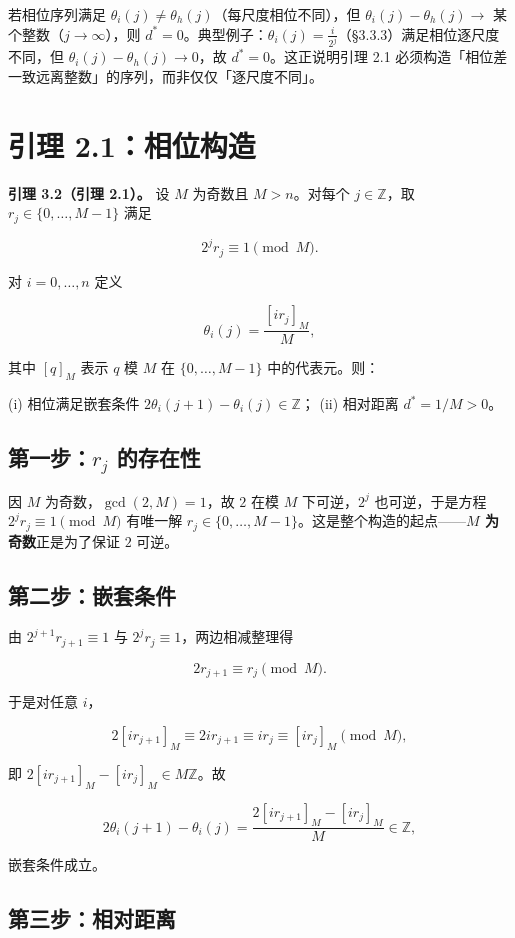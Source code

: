 \documentclass[a4paper,11pt,openany]{ctexbook}
\numberwithin{equation}{chapter}
\numberwithin{figure}{chapter}
\numberwithin{table}{chapter}
\begin{document}
若相位序列满足 $\theta_i(j)\neq\theta_h(j)$（每尺度相位不同），但 $\theta_i(j)-\theta_h(j)\to$ 某个整数（$j\to\infty$），则 $d^*=0$。典型例子：$\theta_i(j)=\frac{i}{2^j}$（§3.3.3）满足相位逐尺度不同，但 $\theta_i(j)-\theta_h(j)\to0$，故 $d^*=0$。这正说明引理 2.1 必须构造「相位差一致远离整数」的序列，而非仅仅「逐尺度不同」。

\section{引理 2.1：相位构造}

\textbf{引理 3.2（引理 2.1）。} 设 $M$ 为奇数且 $M>n$。对每个 $j\in\mathbb Z$，取 $r_j\in\{0,\dots,M-1\}$ 满足

$$2^j r_j\equiv1\pmod M .$$

对 $i=0,\dots,n$ 定义

$$\theta_i(j)=\frac{[ir_j]_M}{M},$$

其中 $[q]_M$ 表示 $q$ 模 $M$ 在 $\{0,\dots,M-1\}$ 中的代表元。则：

(i) 相位满足嵌套条件 $2\theta_i(j+1)-\theta_i(j)\in\mathbb Z$；
(ii) 相对距离 $d^*=1/M>0$。

\subsection{第一步：$r_j$ 的存在性}

因 $M$ 为奇数，$\gcd(2,M)=1$，故 $2$ 在模 $M$ 下可逆，$2^j$ 也可逆，于是方程 $2^j r_j\equiv1\pmod M$ 有唯一解 $r_j\in\{0,\dots,M-1\}$。这是整个构造的起点——\textbf{$M$ 为奇数}正是为了保证 $2$ 可逆。

\subsection{第二步：嵌套条件}

由 $2^{j+1}r_{j+1}\equiv1$ 与 $2^j r_j\equiv1$，两边相减整理得

$$2r_{j+1}\equiv r_j\pmod M .$$

于是对任意 $i$，

$$2[ir_{j+1}]_M\equiv 2ir_{j+1}\equiv ir_j\equiv [ir_j]_M\pmod M,$$

即 $2[ir_{j+1}]_M-[ir_j]_M\in M\mathbb Z$。故

$$2\theta_i(j+1)-\theta_i(j)=\frac{2[ir_{j+1}]_M-[ir_j]_M}{M}\in\mathbb Z,$$

嵌套条件成立。

\subsection{第三步：相对距离}
\end{document}
